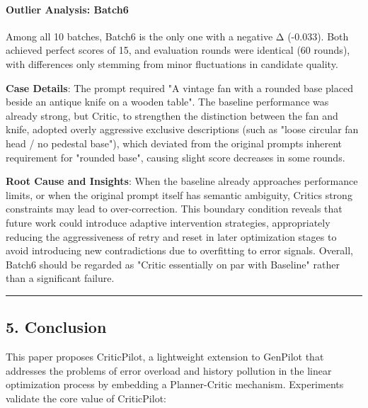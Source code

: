\documentclass[
]{article}
\begin{document}
\paragraph{Outlier Analysis: Batch6}\label{outlier-analysis-batch6}

Among all 10 batches, Batch6 is the only one with a negative Δ (-0.033).
Both achieved perfect scores of 15, and evaluation rounds were identical
(60 rounds), with differences only stemming from minor fluctuations in
candidate quality.

\textbf{Case Details}: The prompt required "A vintage fan with a rounded
base placed beside an antique knife on a wooden table". The baseline
performance was already strong, but Critic, to strengthen the
distinction between the fan and knife, adopted overly aggressive
exclusive descriptions (such as "loose circular fan head / no pedestal
base"), which deviated from the original prompt\textquotesingle s
inherent requirement for "rounded base", causing slight score decreases
in some rounds.

\textbf{Root Cause and Insights}: When the baseline already approaches
performance limits, or when the original prompt itself has semantic
ambiguity, Critic\textquotesingle s strong constraints may lead to
over-correction. This boundary condition reveals that future work could
introduce adaptive intervention strategies, appropriately reducing the
aggressiveness of retry and reset in later optimization stages to avoid
introducing new contradictions due to overfitting to error signals.
Overall, Batch6 should be regarded as "Critic essentially on par with
Baseline" rather than a significant failure.

\begin{center}\rule{0.5\linewidth}{0.5pt}\end{center}

\subsection{5. Conclusion}\label{5-conclusion}

This paper proposes CriticPilot, a lightweight extension to GenPilot
that addresses the problems of error overload and history pollution in
the linear optimization process by embedding a Planner-Critic mechanism.
Experiments validate the core value of CriticPilot:
\end{document}
